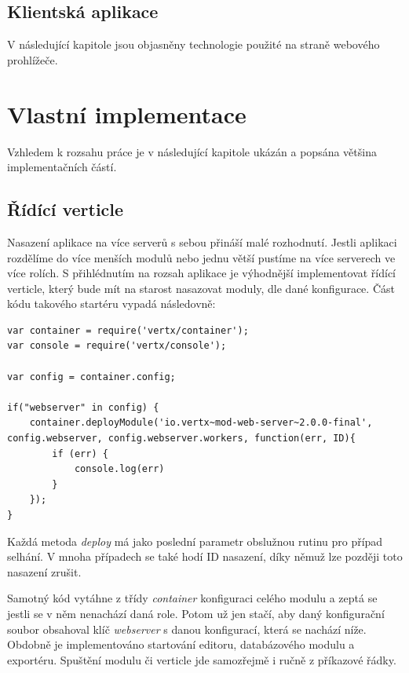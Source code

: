 \subsection{Klientská aplikace}

V následující kapitole jsou objasněny technologie použité na straně webového prohlížeče.


\section{Vlastní implementace}

Vzhledem k rozsahu práce je v následující kapitole ukázán a popsána většina implementačních částí.

\subsection{Řídící verticle}

Nasazení aplikace na více serverů s sebou přináší malé rozhodnutí. Jestli aplikaci rozdělíme do více menších modulů nebo jednu větší pustíme na více serverech ve více rolích. S přihlédnutím na rozsah aplikace je výhodnější implementovat řídící verticle, který bude mít na starost nasazovat moduly, dle dané konfigurace. Část kódu takového startéru vypadá následovně:

\begin{lstlisting}[caption=Řídící verticle]
var container = require('vertx/container');
var console = require('vertx/console');

var config = container.config;

if("webserver" in config) {
	container.deployModule('io.vertx~mod-web-server~2.0.0-final', config.webserver, config.webserver.workers, function(err, ID){
		if (err) {
			console.log(err)
		}
	});
}
\end{lstlisting}

Každá metoda \emph{deploy} má jako poslední parametr obslužnou rutinu pro případ selhání. V mnoha případech se také hodí ID nasazení, díky němuž lze později toto nasazení zrušit.

Samotný kód vytáhne z třídy \emph{container} konfiguraci celého modulu a zeptá se jestli se v něm nenachází daná role. Potom už jen stačí, aby daný konfigurační soubor obsahoval klíč \emph{webserver} s danou konfigurací, která se nachází níže. Obdobně je implementováno startování editoru, databázového modulu a exportéru. Spuštění modulu či verticle jde samozřejmě i ručně z příkazové řádky.

